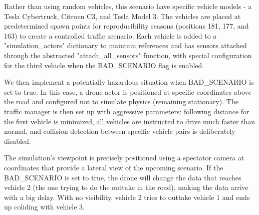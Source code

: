 Rather than using random vehicles, this scenario have specific vehicle models - a Tesla Cybertruck, Citroen C3, and Tesla Model 3. The vehicles are placed at predetermined spawn points for reproducibility reasons (positions 181, 177, and 163) to create a controlled traffic scenario. Each vehicle is added to a "simulation\_actors" dictionary to maintain references and has sensors attached through the abstracted "attach\_all\_sensors" function, with special configuration for the third vehicle when the BAD\_SCENARIO flag is enabled.

We then implement a potentially hazardous situation when BAD\_SCENARIO is set to true. In this case, a drone actor is positioned at specific coordinates above the road and configured not to simulate physics (remaining stationary). The traffic manager is then set up with aggressive parameters: following distance for the first vehicle is minimized, all vehicles are instructed to drive much faster than normal, and collision detection between specific vehicle pairs is deliberately disabled.

The simulation's viewpoint is precisely positioned using a spectator camera at coordinates that provide a lateral view of the upcoming scenario. If the BAD\_SCENARIO is set to true, the drone will change the data that reaches vehicle 2 (the one trying to do the outtake in the road), making the data arrive with a big delay. With no visibility, vehicle 2 tries to outtake vehicle 1 and ends up coliding with vehicle 3.

